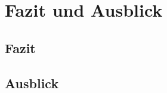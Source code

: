 \chapter{Fazit und Ausblick}
\label{cap:fazit_ausblick}
\section{Fazit}
\label{sec:fazit}
\section{Ausblick}
\label{sec:ausblick}
